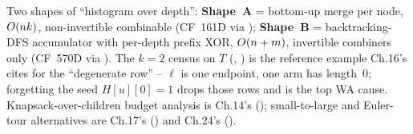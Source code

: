 \begin{recallbox}
Two shapes of ``histogram over depth'': \textbf{Shape~A} = bottom-up
merge per node, $O(nk)$, non-invertible combinable (CF~161D via
); \textbf{Shape~B} = backtracking-DFS
accumulator with per-depth prefix XOR, $O(n+m)$, invertible
combiners only (CF~570D via ). The $k=2$
census on $T$ (, ) is the reference
example Ch.16's  cites for the ``degenerate row''
-- $\ell$ is one endpoint, one arm has length~$0$; forgetting the
seed $\mathit{H}[u][0]=1$ drops those rows and is the top WA cause.
Knapsack-over-children budget analysis is Ch.14's ();
small-to-large and Euler-tour alternatives are Ch.17's ()
and Ch.24's ().
\end{recallbox}
